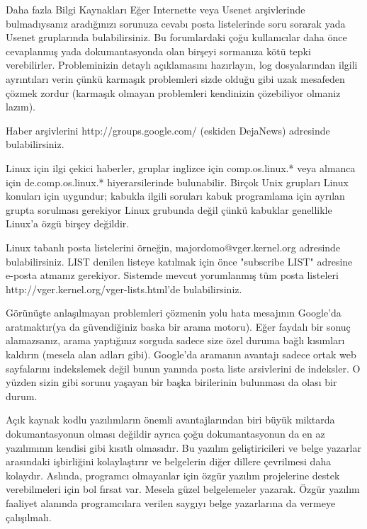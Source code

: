 \begin{section}{Daha fazla Bilgi Kaynakları}
Eğer Internette veya Usenet arşivlerinde bulmadıysanız aradığınızı sorunuza cevabı  posta listelerinde soru sorarak yada Usenet gruplarında bulabilirsiniz. Bu forumlardaki çoğu kullanıcılar daha önce cevaplanmış yada dokumantasyonda olan birşeyi sormanıza kötü tepki verebilirler. Probleminizin detaylı açıklamasını hazırlayın, log dosyalarından ilgili ayrıntıları verin çünkü karmaşık problemleri sizde olduğu gibi uzak mesafeden çözmek zordur (karmaşık olmayan problemleri kendinizin çözebiliyor olmaniz lazım).

Haber arşivlerini http://groups.google.com/ (eskiden DejaNews) adresinde bulabilirsiniz.

Linux için ilgi çekici haberler, gruplar inglizce için comp.os.linux.* veya almanca için de.comp.os.linux.* hiyerarsilerinde bulunabilir. Birçok Unix grupları Linux konuları için uygundur; kabukla ilgili soruları kabuk programlama için ayrılan grupta sorulması gerekiyor Linux grubunda değil çünkü kabuklar genellikle Linux'a özgü birşey değildir.

Linux tabanlı posta listelerini örneğin, majordomo@vger.kernel.org adresinde bulabilirsiniz. LIST denilen listeye katılmak için önce "subscribe LIST" adresine e-posta atmanız gerekiyor. Sistemde mevcut yorumlanmış tüm posta listeleri http://vger.kernel.org/vger-lists.html'de bulabilirsiniz.

Görünüşte anlaşılmayan problemleri çözmenin yolu hata mesajının Google'da aratmaktır(ya da güvendiğiniz baska bir arama motoru). Eğer faydalı bir sonuç alamazsanız, arama yaptığınız sorguda sadece size özel duruma bağlı kısımları kaldırın (mesela alan adları gibi). Google'da aramanın avantajı sadece ortak web sayfalarını indekslemek değil bunun yanında posta liste arsivlerini de indeksler. O yüzden sizin gibi sorunu yaşayan bir başka birilerinin bulunması da olası bir durum.

Açık kaynak kodlu yazılımların önemli avantajlarından biri büyük miktarda dokumantasyonun olması değildir ayrıca çoğu dokumantasyonun da en az yazılımının kendisi gibi kısıtlı olmasıdır. Bu yazılım geliştiricileri ve belge yazarlar arasındaki işbirliğini kolaylaştırır ve belgelerin diğer dillere çevrilmesi daha kolaydır. Aslında, programcı olmayanlar için özgür yazılım projelerine destek verebilmeleri için bol fırsat var. Mesela güzel belgelemeler yazarak. Özgür yazılım faaliyet alanında programcılara verilen saygıyı belge yazarlarına da vermeye çalışılmalı.
\end{section}
